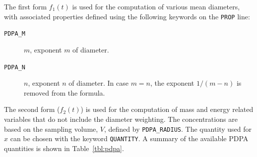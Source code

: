 \documentclass[11pt]{book}
\newcommand{\ct}{\tt\small}
\begin{document}
The first form $f_1(t)$ is used for the computation of various mean diameters, with
associated properties defined using the following keywords on the {\ct PROP} line:
\begin{description}
\item[{\ct PDPA\_M}] $m$, exponent $m$ of diameter.
\item[{\ct PDPA\_N}] $n$, exponent $n$ of diameter. In case $m=n$, the exponent $1/(m-n)$ is removed from the formula.
\end{description}
\noindent The second form ($f_2(t)$) is used for the computation of mass and energy related variables that do not include the diameter weighting.
The concentrations are based on the sampling volume, $V$, defined by {\ct PDPA\_RADIUS}.
The quantity used for $x$ can be chosen with the keyword {\ct QUANTITY}.
A summary of the available PDPA quantities is shown in Table~\ref{tbl:pdpa}.
\end{document}

